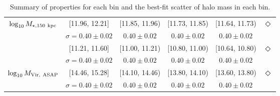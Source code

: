 \begin{table*}
{\begin{tabular}{|c|cccc|c|}
\multirow{2}{*}{$\log_{10} M_{\star, 150\ \rm kpc}$} & [11.96, 12.21] & [11.85, 11.96) & [11.73, 11.85) & [11.64, 11.73) & \multirow{2}{*}{$\Diamond$} \\ 
& $\sigma=0.40\pm0.02$ & $0.40\pm0.02$ & $0.40\pm0.02$ & $0.40\pm0.02$ & \\ \hhline{|======|}

\multirow{2}{*}{$\log_{10} M_{\star, [50, 100]}$} & [11.21, 11.60] & [11.00, 11.21) & [10.80, 11.00) & [10.64, 10.80) & \multirow{2}{*}{$\Diamond$} \\ 
& $\sigma=0.40\pm0.02$ & $0.40\pm0.02$ & $0.40\pm0.02$ & $0.40\pm0.02$ & \\ \hline

\multirow{2}{*}{$\log_{10} M_{\rm Vir,\ ASAP}$} & [14.46, 15.28] & [14.10, 14.46) & [13.80, 14.10) & [13.60, 13.80) & \multirow{2}{*}{$\Diamond$} \\ 
& $\sigma=0.40\pm0.02$ & $0.40\pm0.02$ & $0.40\pm0.02$ & $0.40\pm0.02$ & \\ \hline


\end{tabular}%
}
\caption{Summary of properties for each bin and the best-fit scatter of halo mass in each bin.
	}
\label{tab:summary}
\end{table*}